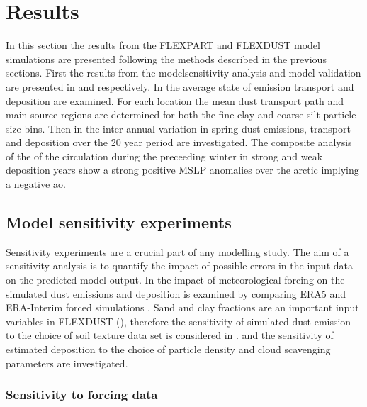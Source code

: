 \chapter{Results}
In this section the results from the FLEXPART and FLEXDUST model simulations are presented following the methods described in the previous sections. First the results from the modelsensitivity analysis and model validation are presented in  and  respectively. 
In   the average state of emission transport and deposition are examined. For each location the mean dust transport path and main source regions are determined for both the fine clay and coarse silt particle size bins. 
Then in  the inter annual variation in spring dust emissions, transport and deposition over the 20 year period are investigated. The composite analysis of the of the circulation during the preceeding winter in strong and weak deposition years show a strong positive MSLP anomalies over the arctic implying a negative \acrshort{ao}.   

\section{Model sensitivity experiments}\label{sec:sensitvity_experiment}
Sensitivity experiments are a crucial part of any modelling study. The aim of a sensitivity analysis is to quantify the impact of possible errors in the input data on the predicted model output. 
In  the impact of meteorological forcing on the simulated dust emissions and deposition is examined by comparing ERA5 and ERA-Interim forced simulations
. Sand and clay fractions are an important input variables in FLEXDUST (), therefore the sensitivity of simulated dust emission to the choice of soil texture data set is considered in .  and  the sensitivity of estimated deposition to the choice of particle density and cloud scavenging parameters are investigated. 
\subsection{Sensitivity to forcing data}\label{sec:sens_forcing}

